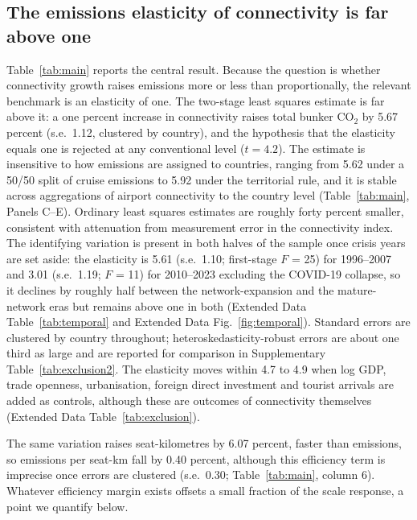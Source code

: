 \documentclass[12pt]{article}
\begin{document}
\subsection*{The emissions elasticity of connectivity is far above one}
Table~\ref{tab:main} reports the central result. Because the question is
whether connectivity growth raises emissions more or less than
proportionally, the relevant benchmark is an elasticity of one. The
two-stage least squares estimate is far above it: a one percent increase in
connectivity raises total bunker CO$_2$ by 5.67 percent (s.e.\ 1.12,
clustered by country), and the hypothesis that the elasticity equals one
is rejected at any conventional level ($t = 4.2$). The estimate is insensitive to how emissions are
assigned to countries, ranging from 5.62 under a 50/50 split of cruise
emissions to 5.92 under the territorial rule, and it is stable across
aggregations of airport connectivity to the country level
(Table~\ref{tab:main}, Panels C--E). Ordinary least squares estimates are
roughly forty percent smaller, consistent with attenuation from measurement
error in the connectivity index. The identifying variation is present in
both halves of the sample once crisis years are set aside: the elasticity
is 5.61 (s.e.\ 1.10; first-stage $F$ = 25) for 1996--2007 and 3.01 (s.e.\
1.19; $F$ = 11) for 2010--2023 excluding the COVID-19 collapse, so it
declines by roughly half between the network-expansion and the
mature-network eras but remains above one in both (Extended Data
Table~\ref{tab:temporal} and Extended Data Fig.~\ref{fig:temporal}).
Standard errors are clustered by country throughout; heteroskedasticity-robust
errors are about one third as large and are reported for comparison in
Supplementary Table~\ref{tab:exclusion2}. The elasticity moves within 4.7
to 4.9 when log GDP, trade openness, urbanisation, foreign direct
investment and tourist arrivals are added as controls, although these are
outcomes of connectivity themselves (Extended Data
Table~\ref{tab:exclusion}).

The same variation raises seat-kilometres by 6.07 percent, faster than
emissions, so emissions per seat-km fall by 0.40 percent, although this
efficiency term is imprecise once errors are clustered (s.e.\ 0.30;
Table~\ref{tab:main}, column 6). Whatever efficiency margin exists offsets
a small fraction of the scale response, a point we quantify below.
\end{document}
